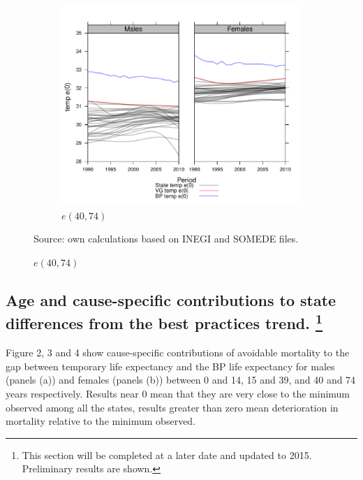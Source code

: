 \documentclass{article}
\begin{document}
\begin{figure}
\begin{subfigure}{\textwidth}
\end{subfigure}
\\
\begin{subfigure}{\textwidth}
\centering
\caption{$e(40,74)$}
\vspace{-2em}
\label{fig:e40_74}
\includegraphics[scale=.5]{Figures/et40_74s.pdf}
\end{subfigure}
Source: own calculations based on INEGI and SOMEDE files. 
\end{figure}



\subsection*{Age and cause-specific contributions to state differences from the best
practices trend. \footnote{This section will be completed at a later date and updated to 2015. Preliminary results are shown.
}}

Figure 2, 3 and 4  show cause-specific contributions of avoidable mortality to the gap between temporary life expectancy and the BP life expectancy for males (panels (a))  and females (panels (b)) between 0 and 14, 15 and 39, and 40 and 74 years respectively. Results near 0 mean that they are very close to the minimum observed among all the states, results greater than zero mean deterioration in mortality relative to the minimum observed. 
\end{document}
